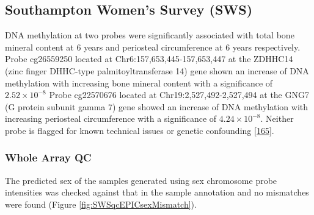 \documentclass[
]{book}
\begin{document}
\hypertarget{southampton-womens-survey-sws}{%
\subsection{Southampton Women's Survey (SWS)}\label{southampton-womens-survey-sws}}

DNA methylation at two probes were significantly associated with total bone mineral content at 6 years and periosteal circumference at 6 years respectively.
Probe cg26559250 located at Chr6:157,653,445-157,653,447 at the ZDHHC14 (zinc finger DHHC-type palmitoyltransferase 14) gene shown an increase of DNA methylation with increasing bone mineral content with a significance of \(2.52\times 10^{-8}\)
Probe cg22570676 located at Chr19:2,527,492-2,527,494 at the GNG7 (G protein subunit gamma 7) gene showed an increase of DNA methylation with increasing periosteal circumference with a significance of \(4.24\times 10^{-8}\).
Neither probe is flagged for known technical issues or genetic confounding {[}\protect\hyperlink{ref-Zhou2017}{165}{]}.

\hypertarget{whole-array-qc-2}{%
\subsubsection{Whole Array QC}\label{whole-array-qc-2}}

The predicted sex of the samples generated using sex chromosome probe intensities was checked against that in the sample annotation and no mismatches were found (Figure \ref{fig:SWSqcEPICsexMismatch}).
\end{document}
